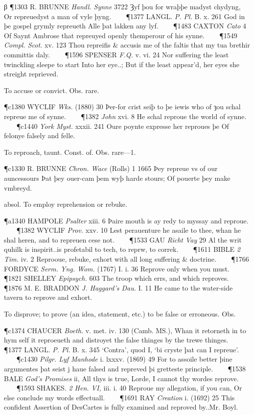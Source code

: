 \begin{description}[wide, labelwidth=!, labelindent=0pt]
\begin{myenumerate}
 β \P 1303 R.  BRUNNE \textit{Handl. Synne} 3722 Ȝyf þou for wraþþe madyst chydyng, Or repreuedyst a man of vyle þyng.    
\P 1377 LANGL.  \textit{P. Pl.} B. x. 261 God in þe gospel grymly repreueth Alle þat lakken any lyf.    
\P 1483 CAXTON  \textit{Cato} 4 Of Saynt Ambrose that repreuyed openly themperour of his synne.    
\P 1549  \textit{Compl. Scot.} xv. 123 Thou repreifis \& accusis me of the faltis that my tua brethir committis daly.    
\P 1596 SPENSER  \textit{F.Q.} v. vi. 24 Nor suffering the least twinckling sleepe to start Into her eye..; But if the least appear'd, her eyes she streight reprieved.

 To accuse or convict. Obs. rare.

\P c1380 WYCLIF  \textit{Wks.} (1880) 30 Þer-for crist seiþ to þe iewis who of ȝou schal repreue me of synne.    
\P 1382   \textit{John} xvi. 8 He schal reproue the world of synne.    
\P c1440  \textit{York Myst.} xxxii. 241 Oure poynte expresse her reproues þe Of felonye falsely and felle.

 To reproach, taunt. Const. of. Obs. rare—1.

\P c1330 R. BRUNNE  \textit{Chron. Wace} (Rolls) 1 1665 Þey  repreue vs of our auncessours Þat þey ouer-cam þem wyþ harde stours; Of pouerte þey make vmbreyd.

 absol. To employ reprehension or rebuke.

\P a1340 HAMPOLE  \textit{Psalter} xiii. 6 Þaire mouth is ay redy to myssay and reproue.    
\P 1382 WYCLIF  \textit{Prov.} xxv. 10 Lest perauenture he asaile to thee, whan he shal heren, and to repreuen cese not.    
\P 1533 GAU  \textit{Richt Vay} 29 Al the writ quhilk is inspirit..is profetabil to tech, to reprw, to correk.    
\P 1611 BIBLE  \textit{2 Tim.} iv. 2 Reprooue, rebuke, exhort with all long suffering \& doctrine.    
\P 1766 FORDYCE  \textit{Serm. Yng. Wom.} (1767) I. i. 36 Reprove only when you must.    
\P 1821 SHELLEY  \textit{Epipsych.} 603 The troop which errs, and which reproves.    
\P 1876 M. E. BRADDON  \textit{J. Haggard's Dau.} I. 11 He came to the water-side tavern to reprove and exhort.

 To disprove; to prove (an idea, statement, etc.) to be false or erroneous. Obs.

\P c1374 CHAUCER  \textit{Boeth.} v. met. iv. 130 (Camb. MS.), Whan it retorneth in to hym self it reproeueth and distroyet the false thinges by the trewe thinges.    
\P 1377 LANGL.  \textit{P. Pl.} B. x. 345 ‘Contra’, quod I, ‘bi cryste þat can I repreue’.    
\P c1430  \textit{Pilgr. Lyf Manhode} i. lxxxv. (1869) 49 For to assoile better þine argumentes þat seist j haue falsed and repreved þi gretteste principle.    
\P 1538 BALE  \textit{God's Promises} ii, All thys is true, Lorde, I cannot thy wordes reprove.    
\P 1593 SHAKES.  \textit{2 Hen. VI,} iii. i. 40 Reproue my allegation, if you can, Or else conclude my words effectuall.    
\P 1691 RAY  \textit{Creation} i. (1692) 25 This confident Assertion of DesCartes is fully examined and reproved by..Mr. Boyl.


\end{myenumerate}
\end{description}
